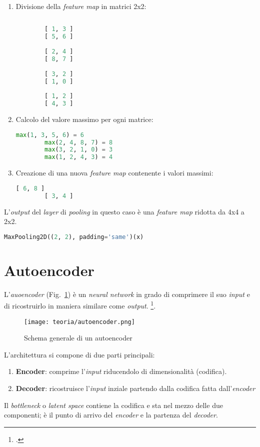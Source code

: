 \begin{enumerate}
    \item Divisione della \emph{feature map} in matrici 2x2:
    \begin{lstlisting}[language=Python, frame=none]
    
        [ 1, 3 ]
        [ 5, 6 ]
        
        [ 2, 4 ]
        [ 8, 7 ]
        
        [ 3, 2 ]
        [ 1, 0 ]
        
        [ 1, 2 ]
        [ 4, 3 ]

    \end{lstlisting}
    \item Calcolo del valore massimo per ogni matrice:
    
    \begin{lstlisting}[language=Python, frame=none]
        max(1, 3, 5, 6) = 6
        max(2, 4, 8, 7) = 8
        max(3, 2, 1, 0) = 3
        max(1, 2, 4, 3) = 4
    \end{lstlisting}

    \item Creazione di una nuova \emph{feature map} contenente i valori massimi:
    \begin{lstlisting}[language=Python, frame=none]
        [ 6, 8 ]
        [ 3, 4 ]
    \end{lstlisting}
\end{enumerate}
L'\emph{output} del \emph{layer} di \emph{pooling} in questo caso è una \emph{feature map} ridotta da 4x4 a 2x2.

\begin{lstlisting}[language=Python, frame=none]
    MaxPooling2D((2, 2), padding='same')(x)
\end{lstlisting}

\newpage

\section{Autoencoder}
L'\emph{auoencoder} (Fig.~\ref{fig:autoencoder-teoria}) è un \emph{neural network} in grado di comprimere il suo \emph{input} e di ricostruirlo in maniera similare come \emph{output}. \footcite[p.~499]{Goodfellow-et-al-2016}.

\begin{figure}[!h] 
    \centering 
    \texttt{[image: teoria/autoencoder.png]} 
    \caption{Schema generale di un autoencoder}
    \label{fig:autoencoder-teoria}
  \end{figure}
L'architettura si compone di due parti principali:
\begin{enumerate}
    \item \textbf{Encoder}: comprime l'\emph{input} riducendolo di dimensionalità (codifica).
    \item \textbf{Decoder}: ricostruisce l'\emph{input} inziale partendo dalla codifica fatta dall'\emph{encoder}
\end{enumerate}
Il \emph{bottleneck} o \emph{latent space} contiene la codifica e sta nel mezzo delle due componenti; è il punto di arrivo del \emph{encoder} e la partenza del \emph{decoder}.

